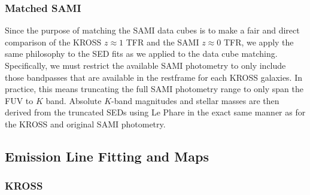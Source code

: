 \documentclass[a4paper,fleqn,usenatbib]{mnras}
\begin{document}
\subsubsection{Matched SAMI}
\label{subsubsec:SAMILQSED}

Since the purpose of matching the SAMI data cubes is to make a fair and direct comparison of the KROSS $z\approx1$ TFR and the SAMI $z \approx 0$ TFR, we apply the same philosophy to the SED fits as we applied to the data cube matching. Specifically, we must restrict the available SAMI photometry to only include those bandpasses that are available in the restframe for each KROSS galaxies. In practice, this means truncating the full SAMI photometry range to only span the FUV to $K$ band. Absolute $K$-band magnitudes and stellar masses are then derived from the truncated SEDs using {\sc Le Phare} in the exact same manner as for the KROSS and original SAMI photometry.


\subsection{Emission Line Fitting and Maps}
\label{subsec:linemaps}

\subsubsection{KROSS}
\label{subsubsec:KROSSvelfields}
\end{document}

